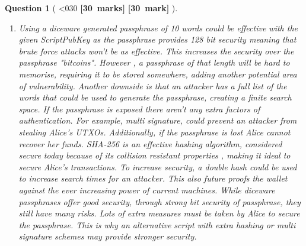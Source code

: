 \documentclass[a4paper]{article}
\theoremstyle{que}
\newtheorem{question}{Question}
\newcommand\points[1]{%
\ifnum1<0#1\relax%
    {\bf \small [#1~marks]}%
  \else%
    {\bf \small [#1~mark]}%
  \fi%
}%
\begin{document}
\begin{question}[\points{30}]
\begin{enumerate}[label=(\alph*)]
    \item Using a diceware generated passphrase of 10 words could be effective with the given ScriptPubKey as the passphrase provides 128 bit security \cite{antonov2020security} meaning that brute force attacks won't be as effective. This increases the security over the passphrase "bitcoins". However , a passphrase of that length will be hard to memorise, requiring it to be stored somewhere, adding another potential area of vulnerability. Another downside is that an attacker has a full list of the words that could be used to generate the passphrase, creating a finite search space. If the passphrase is exposed there aren't any extra factors of authentication. For example, multi signature, could prevent an attacker from stealing Alice's UTXOs. Additionally, if the passphrase is lost Alice cannot recover her funds. SHA-256 is an effective hashing algorithm, considered secure today because of its collision resistant properties \cite{gilbert2003security}, making it ideal to secure Alice's transactions. To increase security, a double hash could be used to increase search times for an attacker. This also future proofs the wallet against the ever increasing power of current machines. While diceware passphrases offer good security, through strong bit security of passphrase, they still have many risks. Lots of extra measures must be taken by Alice to secure the passphrase. This is why an alternative script with extra hashing or multi signature schemes may provide stronger security.
    

\end{enumerate}
\end{question}
\end{document}
